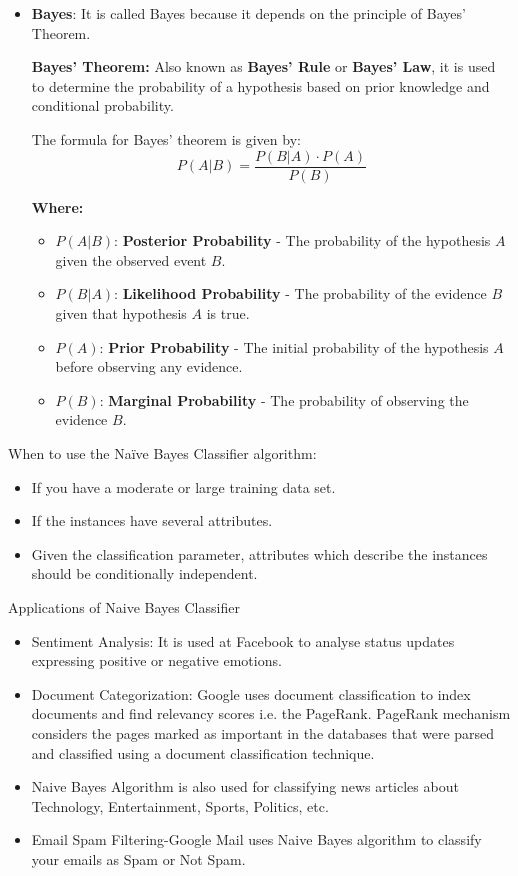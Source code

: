 \begin{itemize}
	\item \textbf{Bayes}: It is called Bayes because it depends on the principle of Bayes' Theorem.
	
	\medskip
	
	
	\textbf{Bayes' Theorem:} Also known as \textbf{Bayes' Rule} or \textbf{Bayes' Law}, it is used to determine the probability of a hypothesis based on prior knowledge and conditional probability.
	
	\bigskip
	The formula for Bayes' theorem is given by:
	\[
	P(A|B) = \frac{P(B|A) \cdot P(A)}{P(B)}
	\]
	
	\textbf{Where:}
	\begin{itemize}
		\item \( P(A|B) \): \textbf{Posterior Probability} - The probability of the hypothesis \( A \) given the observed event \( B \).
		\item \( P(B|A) \): \textbf{Likelihood Probability} - The probability of the evidence \( B \) given that hypothesis \( A \) is true.
		\item \( P(A) \): \textbf{Prior Probability} - The initial probability of the hypothesis \( A \) before observing any evidence.
		\item \( P(B) \): \textbf{Marginal Probability} - The probability of observing the evidence \( B \).
	\end{itemize}
\end{itemize}


\begin{frame}{When to use the Naïve Bayes Classifier algorithm:}
\begin{itemize}
	\item If you have a moderate or large training data set.
	\item If the instances have several attributes.
	\item Given the classification parameter, attributes which describe the instances should be conditionally independent.
\end{itemize}
\end{frame}

\begin{frame}{Applications of Naive Bayes Classifier}
	

	
	\begin{itemize}
		\item Sentiment Analysis: It is used at Facebook to analyse status updates expressing positive or negative emotions.
		\item Document Categorization: Google uses document classification to index documents and find relevancy scores i.e. the PageRank. PageRank mechanism considers the pages marked as important in the databases that were parsed and classified using a document classification technique.
		\item Naive Bayes Algorithm is also used for classifying news articles about Technology, Entertainment, Sports, Politics, etc.
		\item Email Spam Filtering-Google Mail uses Naive Bayes algorithm to classify your emails as Spam or Not Spam.
\end{itemize}
\end{frame}


